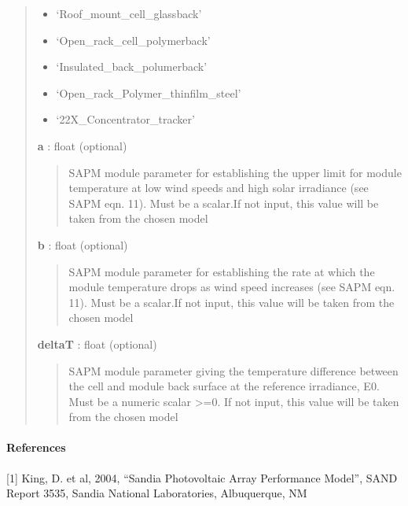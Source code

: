 \documentclass[letterpaper,10pt,english]{sphinxmanual}
\begin{document}
\begin{fulllineitems}
\begin{quote}
\begin{description}
\begin{itemize}
\item {} 
`Roof\_mount\_cell\_glassback'

\item {} 
`Open\_rack\_cell\_polymerback'

\item {} 
`Insulated\_back\_polumerback'

\item {} 
`Open\_rack\_Polymer\_thinfilm\_steel'

\item {} 
`22X\_Concentrator\_tracker'

\end{itemize}

\textbf{a} : float (optional)
\begin{quote}

SAPM module parameter for establishing the upper limit for module 
temperature at low wind speeds and high solar irradiance (see SAPM
eqn. 11). Must be a scalar.If not input, this value will be taken from the chosen
model
\end{quote}

\textbf{b} : float (optional)
\begin{quote}

SAPM module parameter for establishing the rate at which the module
temperature drops as wind speed increases (see SAPM eqn. 11). Must be
a scalar.If not input, this value will be taken from the chosen
model
\end{quote}

\textbf{deltaT} : float (optional)
\begin{quote}

SAPM module parameter giving the temperature difference
between the cell and module back surface at the reference irradiance,
E0. Must be a numeric scalar \textgreater{}=0. If not input, this value will be taken from the chosen
model
\end{quote}

\end{description}\end{quote}




{\hyperref[stubs/pvlib.pvl_sapm:pvlib.pvl_sapm]{}}


\paragraph{References}

{[}1{]} King, D. et al, 2004, ``Sandia Photovoltaic Array Performance Model'', SAND Report
3535, Sandia National Laboratories, Albuquerque, NM

\end{fulllineitems}
\end{document}
